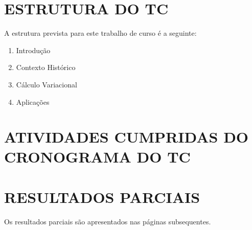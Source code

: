 \documentclass[
	12pt,				%
	openright,			%
    oneside,			%
	a4paper,			%
	english,			%
	french,				%
	spanish,			%
	brazil				%
	]{abntex2}
\numberwithin{lema}{chapter}
\numberwithin{teorema}{chapter}
\numberwithin{definicao}{chapter}
\numberwithin{figure}{chapter}
\begin{document}

\frenchspacing 

\pretextual
{
	\imprimircapa
	\clearpage
}
%
%
\pagestyle{ueg_mat_heading}
{
	\section*{ESTRUTURA DO TC}

	A estrutura prevista para este trabalho de curso é a seguinte:
	
	\begin{enumerate}[align=left,leftmargin=*,label=\textbf{Capítulo \arabic*}:]
		\item Introdução
		\item Contexto Histórico
		\item Cálculo Variacional
		\item Aplicações
		\estruturaReferencias
	\end{enumerate}

	\section*{ATIVIDADES CUMPRIDAS DO CRONOGRAMA DO TC}

	
	
	\section*{RESULTADOS PARCIAIS}
	
	Os resultados parciais são apresentados nas páginas subsequentes.
	
}
\clearpage

%
%
\thispagestyle{abntheadings}
\textual
{
	
	
	\newpage
	\thispagestyle{ueg_mat_heading}
	
	
	
	\imprimirfolhacompromisso
}
\end{document}
